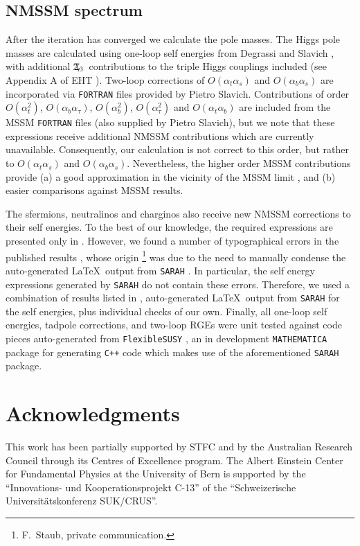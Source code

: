 \documentclass[final,3p,times,pdflatex]{elsarticle}
\newcommand{\Zv}{\,\mathbf{\backslash}\mkern-11.0mu{\mathbb{Z}}_{3}} %
\def\at{\alpha_t}
\def\ab{\alpha_b}
\def\as{\alpha_s}
\def\atau{\alpha_{\tau}}
\def\oatab{O(\at\ab)}
\def\oatas{O(\at\as)}
\def\oabas{O(\ab\as)}
\def\oatq{O(\at^2)}
\def\oabq{O(\ab^2)}
\def\oatauq{O(\atau^2)}
\def\oabatau{O(\ab \atau)}
\begin{document}
\subsection{NMSSM spectrum \label{spec}}
After the iteration has converged we calculate the pole masses.  The
Higgs pole masses are calculated using one-loop self energies from Degrassi and 
Slavich \cite{Degrassi:2009yq}, with additional $\Zv$~contributions to the 
triple Higgs couplings included (see Appendix A of EHT \cite{Ellwanger:2009dp}).
Two-loop corrections \cite{Degrassi:2009yq} of $\oatas$ and $\oabas$ are 
incorporated via {\tt FORTRAN} files provided by Pietro Slavich.  Contributions 
of order $\oatq$, $\oabatau$, $\oabq$, $\oatauq$ and $\oatab$ are included from 
the MSSM {\tt FORTRAN} files (also supplied by Pietro Slavich), but we note that
 these expressions receive additional NMSSM contributions which are currently 
unavailable.  Consequently, our calculation is not correct to this order, but 
rather to $\oatas$ and $\oabas$.  Nevertheless, the higher order MSSM 
contributions provide (a) a good approximation in the vicinity of the MSSM limit
, and (b) easier comparisons against MSSM results.

The sfermions, neutralinos and charginos also receive new NMSSM corrections to 
their self energies. To the best of our knowledge, the required expressions are 
presented only in \cite{Staub:2010ty}. However, we found a number of 
typographical errors in the published results \cite{Staub:2010ty}, whose 
origin%
\footnote{F.~Staub, private communication.} 
was due to the need to manually condense the auto-generated \LaTeX~output from 
{\tt SARAH} \cite{Staub:2009bi,Staub:2010jh,Staub:2012pb,Staub:2013tta}.  In 
particular, the self energy expressions generated by {\tt SARAH} do not contain 
these errors. Therefore, we used a combination of results listed in 
\cite{Staub:2010ty}, auto-generated \LaTeX~output from {\tt SARAH} for the self 
energies, plus individual checks of our own.
Finally, all one-loop self energies, tadpole corrections, and two-loop RGEs were
 unit tested against code pieces auto-generated from {\tt FlexibleSUSY} 
\cite{flexi-susy}, an in development {\tt MATHEMATICA} package for generating 
{\tt C++} code which makes use of the aforementioned {\tt SARAH} package. 


\section*{Acknowledgments}
This work has been partially supported by STFC 
and by the Australian Research Council through its Centres of Excellence 
program. The Albert Einstein Center for Fundamental Physics at the University 
of Bern is supported by the ``Innovations- und Kooperationsprojekt C-13'' of the
 ``Schweizerische Universit\"{a}tskonferenz SUK/CRUS''.
\end{document}
